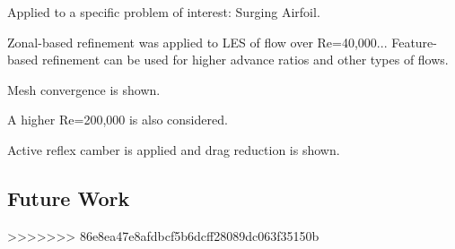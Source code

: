 Applied to a specific problem of interest: Surging Airfoil.

Zonal-based refinement was applied to LES of flow over Re=40,000...
Feature-based refinement can be used for higher advance ratios and other types of flows.

Mesh convergence is shown.

A higher Re=200,000 is also considered.

Active reflex camber is applied and drag reduction is shown.

\subsection{Future Work}
>>>>>>> 86e8ea47e8afdbcf5b6dcff28089dc063f35150b
